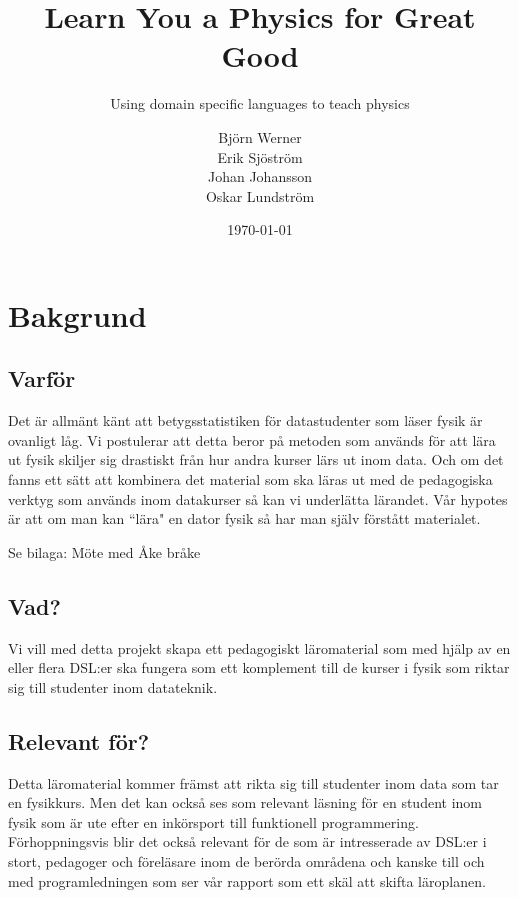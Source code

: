 \documentclass[12pt,a4paper]{scrartcl}
\begin{document}

\title{Learn You a Physics for Great Good}
\subtitle{Using domain specific languages to teach physics}
\date{\today}
\author{Björn Werner\\ Erik Sjöström \\ Johan Johansson \\ Oskar Lundström}

\maketitle

\newpage
\tableofcontents

\newpage
\setcounter{page}{1}

\section{Bakgrund}

\subsection{Varför}

Det är allmänt känt att betygsstatistiken för datastudenter som läser fysik är ovanligt låg. Vi postulerar att detta beror på metoden som används för att lära ut fysik skiljer sig drastiskt från hur andra kurser lärs ut inom data. Och om det fanns ett sätt att kombinera det material som ska läras ut med de pedagogiska verktyg som används inom datakurser så kan vi underlätta lärandet. Vår hypotes är att om man kan ``lära" en dator fysik så har man själv förstått materialet.

Se bilaga: Möte med Åke bråke

\subsection{Vad?}
Vi vill med detta projekt skapa ett pedagogiskt läromaterial som med hjälp av en eller flera DSL:er ska fungera som ett komplement till de kurser i fysik som riktar sig till studenter inom datateknik.

\subsection{Relevant för?}

Detta läromaterial kommer främst att rikta sig till studenter inom data som tar en fysikkurs. Men det kan också ses som relevant läsning för en student inom fysik som är ute efter en inkörsport till funktionell programmering. Förhoppningsvis blir det också relevant för de som är intresserade av DSL:er i stort, pedagoger och föreläsare inom de berörda områdena och kanske till och med programledningen som ser vår rapport som ett skäl att skifta läroplanen.
\end{document}
